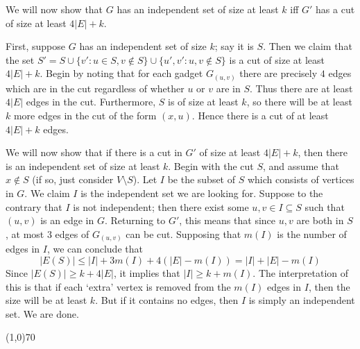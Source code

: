\begin{figure}[h]
	\centering
{}
\end{figure}

We will now show that $G$ has an independent set of size at least $k$ iff $G'$ has a cut of size at least $4|E|+k$.

First, suppose $G$ has an independent set of size $k$; say it is $S$. Then we claim that the set $S'=S\cup\{v':u\in S,v\notin S\}\cup\{u',v':u,v\notin S\}$ is a cut of size at least $4|E|+k$. Begin by noting that for each gadget $G_{(u,v)}$ there are precisely $4$ edges which are in the cut regardless of whether $u$ or $v$ are in $S$. Thus there are at least $4|E|$ edges in the cut. Furthermore, $S$ is of size at least $k$, so there will be at least $k$ more edges in the cut of the form $(x,u)$. Hence there is a cut of at least $4|E|+k$ edges.

We will now show that if there is a cut in $G'$ of size at least $4|E|+k$, then there is an independent set of size at least $k$. Begin with the cut $S$, and assume that $x\notin S$ (if so, just consider $V\setminus S$). Let $I$ be the subset of $S$ which consists of vertices in $G$. We claim $I$ is the independent set we are looking for. Suppose to the contrary that $I$ is not independent; then there exist some $u,v\in I\subseteq S$ such that $(u,v)$ is an edge in $G$. Returning to $G'$, this means that since $u,v$ are both in $S$, at most $3$ edges of $G_{(u,v)}$ can be cut. Supposing that $m(I)$ is the number of edges in $I$, we can conclude that
$$|E(S)|\leq |I|+3m(I)+4(|E|-m(I))=|I|+|E|-m(I)$$
Since $|E(S)|\geq k+4|E|$, it implies that $|I|\geq k+m(I)$. The interpretation of this is that if each `extra' vertex is removed from the $m(I)$ edges in $I$, then the size will be at least $k$. But if it contains no edges, then $I$ is simply an independent set. We are done.

\begin{center}
	\line(1,0){70}
\end{center}

